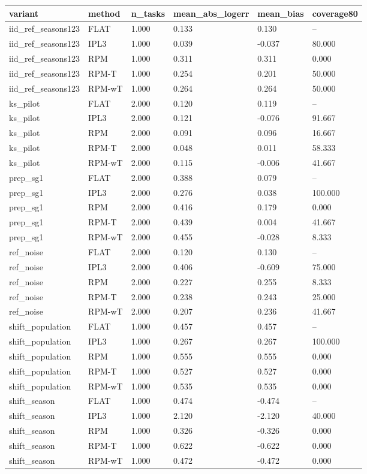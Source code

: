 \begin{tabular}{llllll}
\hline
variant & method & n\_tasks & mean\_abs\_logerr & mean\_bias & coverage80 \\
\hline
iid\_ref\_seasons123 & FLAT & 1.000 & 0.133 & 0.130 & – \\
iid\_ref\_seasons123 & IPL3 & 1.000 & 0.039 & -0.037 & 80.000 \\
iid\_ref\_seasons123 & RPM & 1.000 & 0.311 & 0.311 & 0.000 \\
iid\_ref\_seasons123 & RPM-T & 1.000 & 0.254 & 0.201 & 50.000 \\
iid\_ref\_seasons123 & RPM-wT & 1.000 & 0.264 & 0.264 & 50.000 \\
ks\_pilot & FLAT & 2.000 & 0.120 & 0.119 & – \\
ks\_pilot & IPL3 & 2.000 & 0.121 & -0.076 & 91.667 \\
ks\_pilot & RPM & 2.000 & 0.091 & 0.096 & 16.667 \\
ks\_pilot & RPM-T & 2.000 & 0.048 & 0.011 & 58.333 \\
ks\_pilot & RPM-wT & 2.000 & 0.115 & -0.006 & 41.667 \\
prep\_sg1 & FLAT & 2.000 & 0.388 & 0.079 & – \\
prep\_sg1 & IPL3 & 2.000 & 0.276 & 0.038 & 100.000 \\
prep\_sg1 & RPM & 2.000 & 0.416 & 0.179 & 0.000 \\
prep\_sg1 & RPM-T & 2.000 & 0.439 & 0.004 & 41.667 \\
prep\_sg1 & RPM-wT & 2.000 & 0.455 & -0.028 & 8.333 \\
ref\_noise & FLAT & 2.000 & 0.120 & 0.130 & – \\
ref\_noise & IPL3 & 2.000 & 0.406 & -0.609 & 75.000 \\
ref\_noise & RPM & 2.000 & 0.227 & 0.255 & 8.333 \\
ref\_noise & RPM-T & 2.000 & 0.238 & 0.243 & 25.000 \\
ref\_noise & RPM-wT & 2.000 & 0.207 & 0.236 & 41.667 \\
shift\_population & FLAT & 1.000 & 0.457 & 0.457 & – \\
shift\_population & IPL3 & 1.000 & 0.267 & 0.267 & 100.000 \\
shift\_population & RPM & 1.000 & 0.555 & 0.555 & 0.000 \\
shift\_population & RPM-T & 1.000 & 0.527 & 0.527 & 0.000 \\
shift\_population & RPM-wT & 1.000 & 0.535 & 0.535 & 0.000 \\
shift\_season & FLAT & 1.000 & 0.474 & -0.474 & – \\
shift\_season & IPL3 & 1.000 & 2.120 & -2.120 & 40.000 \\
shift\_season & RPM & 1.000 & 0.326 & -0.326 & 0.000 \\
shift\_season & RPM-T & 1.000 & 0.622 & -0.622 & 0.000 \\
shift\_season & RPM-wT & 1.000 & 0.472 & -0.472 & 0.000 \\
\hline
\end{tabular}

